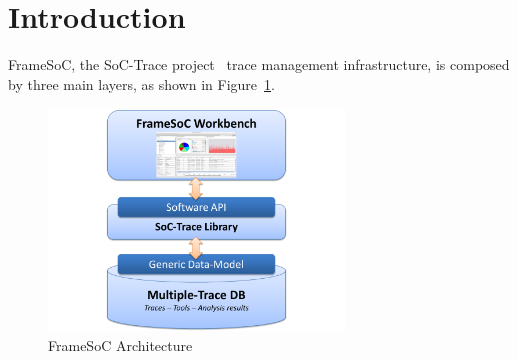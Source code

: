 \documentclass[twoside]{article}
\begin{document}
\begin{sloppypar} %

\shorthandoff{:} %

\newcommand{\parag}[1]{\paragraph{#1}\mbox{}\\}
\newcommand{\subparag}[1]{\subparagraph{#1}\mbox{}\\}
\newcommand{\subsubparag}[1]{\subparagraph{#1}}
\renewcommand{\labelitemi}{$\bullet$}
\renewcommand{\labelitemii}{$\circ$}

\makeRT 

\renewcommand{\contentsname}{Table of contents}
\tableofcontents
\newpage
\section{Introduction}
\label{sec:introduction}


FrameSoC, the SoC-Trace project~\cite{SoC-TRACE} trace management infrastructure, is composed by three main layers, as shown in Figure~\ref{fig:architecture}.

\begin{figure}[h]
  \centering
    \includegraphics[width=0.7\textwidth]{images/framesoc_architecture.pdf}
  \caption{FrameSoC Architecture}
  \label{fig:architecture}
\end{figure}


\end{sloppypar}
\end{document}
